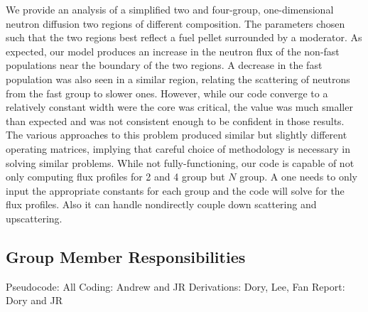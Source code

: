\documentclass[../main.tex]{subfiles}
\begin{document}
	We provide an analysis of a simplified two and four-group, one-dimensional neutron diffusion two regions of different composition. The parameters chosen such that the two regions best reflect a fuel pellet surrounded by a moderator. As expected, our model produces an increase in the neutron flux of the non-fast populations near the boundary of the two regions. A decrease in the fast population was also seen in a similar region, relating the scattering of neutrons from the fast group to slower ones. 
	However, while our code converge to a relatively constant width were the core was critical, the value was much smaller than expected and was not consistent enough to be confident in those results. The various approaches to this problem produced similar but slightly different operating matrices, implying that careful choice of methodology is necessary in solving similar problems. 
	While not fully-functioning, our code is capable of not only computing flux profiles for 2 and 4 group but $N$ group. A one needs to only input the appropriate constants for each group and the code will solve for the flux profiles. Also it can handle nondirectly couple down scattering and upscattering. 

\subsection{Group Member Responsibilities}
Pseudocode: All
Coding: Andrew and JR
Derivations: Dory, Lee, Fan
Report: Dory and JR
\end{document}
